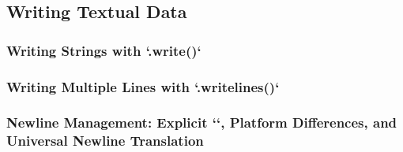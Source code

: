 \subsection{Writing Textual Data}
\subsubsection{Writing Strings with `.write()`}
\subsubsection{Writing Multiple Lines with `.writelines()`}
\subsubsection{Newline Management: Explicit `\n`, Platform Differences, and Universal Newline Translation}
